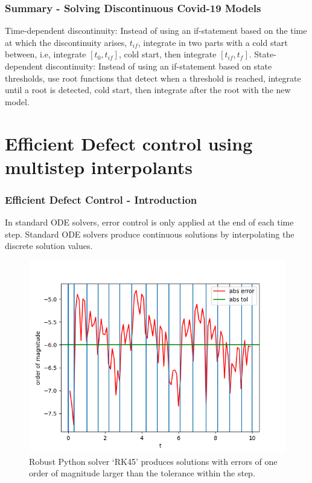 \documentclass{beamer}
\begin{document}
\begin{frame}
\frametitle{Summary - Solving Discontinuous Covid-19 Models}
Time-dependent discontinuity:
Instead of using an if-statement based on the time at which the discontinuity arises, $t_{if}$, integrate in two parts with a cold start between, i.e, integrate $[t_0, t_{if}]$, cold start, then integrate $[t_{if}, t_f]$.
\newline \newline
State-dependent discontinuity:
Instead of using an if-statement based on state thresholds, use root functions that detect when a threshold is reached, integrate until a root is detected, cold start, then integrate after the root with the new model.
\newline \newline
\end{frame}

\section{Efficient Defect control using multistep interpolants}
\begin{frame}
\frametitle{Efficient Defect Control - Introduction}
In standard ODE solvers, error control is only applied at the end of each time step.
Standard ODE solvers produce continuous solutions by interpolating the discrete solution values.
\begin{figure}[H]
    \centering
    \includegraphics[width=0.7\linewidth]{./figures/no_middle_step_error_control_p3_rk45}
    \caption{Robust Python solver `RK45' produces solutions with errors of one order of magnitude larger than the tolerance within the step.}
    \label{fig:no_middle_step_error_control_p3_rk45}
\end{figure}
\end{frame}
\end{document}
